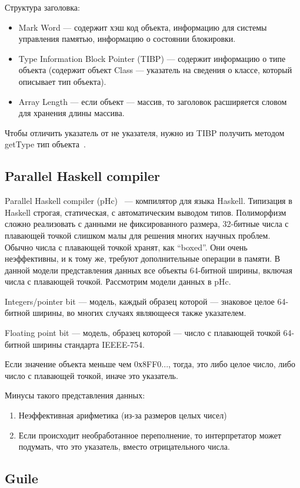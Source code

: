 \documentclass[12pt,a4paper]{article}
\begin{document}
Структура заголовка:
\begin{itemize}
\item Mark Word — содержит хэш код объекта, информацию для системы управления памятью, информацию о состоянии блокировки. 
\item Type Information Block Pointer (TIBP) — содержит информацию о типе объекта (содержит объект Class — указатель на сведения о классе, который описывает тип объекта).
\item Array Length — если объект — массив, то заголовок расширяется словом для хранения длины массива.
\end{itemize}            
Чтобы отличить указатель от не указателя, нужно из TIBP получить методом getType тип объекта~\cite{java.lang,java}.

\subsection {Parallel Haskell compiler}
Parallel Haskell compiler (pHc)~\cite{pHc} — компилятор для языка Haskell.
Типизация в Haskell строгая, статическая, с автоматическим выводом типов.
Полиморфизм сложно реализовать с данными не фиксированного размера, 32-битные
числа с плавающей точкой слишком малы для решения многих научных проблем. Обычно
числа с плавающей точкой хранят, как ``boxed''. 
Они очень неэффективны, и к тому же, требуют дополнительные операции в памяти.
В данной модели представления данных все объекты 64-битной ширины, включая числа с плавающей точкой.
Рассмотрим модели данных в pHc.

Integers/pointer bit — модель, каждый образец которой --- знаковое целое 64-битной ширины, 
во многих случаях являющееся также указателем.

Floating point bit — модель, образец которой --- число с плавающей точкой 64-битной ширины стандарта IEEEE-754.

Если значение объекта
меньше чем 0х8FF0...,
тогда, это либо целое число, либо число с плавающей точкой,
иначе это указатель.

Минусы такого представления данных: 
\begin{enumerate}
\item Неэффективная арифметика (из-за размеров целых чисел)
\item Если происходит необработанное переполнение, то интерпретатор может 
подумать, что это указатель, вместо отрицательного числа.
\end{enumerate}
\subsection {Guile}
\end{document}
